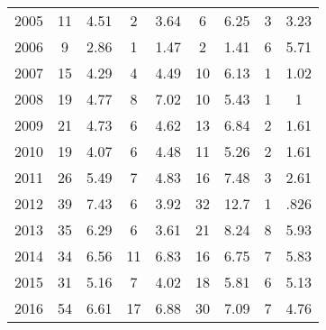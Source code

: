 \begin{table}[htbp]
\begin{tabular}{l*{8}{c}}
2005      &       11&     4.51&        2&     3.64&        6&     6.25&        3&     3.23\\
2006      &        9&     2.86&        1&     1.47&        2&     1.41&        6&     5.71\\
2007      &       15&     4.29&        4&     4.49&       10&     6.13&        1&     1.02\\
2008      &       19&     4.77&        8&     7.02&       10&     5.43&        1&        1\\
2009      &       21&     4.73&        6&     4.62&       13&     6.84&        2&     1.61\\
2010      &       19&     4.07&        6&     4.48&       11&     5.26&        2&     1.61\\
2011      &       26&     5.49&        7&     4.83&       16&     7.48&        3&     2.61\\
2012      &       39&     7.43&        6&     3.92&       32&     12.7&        1&     .826\\
2013      &       35&     6.29&        6&     3.61&       21&     8.24&        8&     5.93\\
2014      &       34&     6.56&       11&     6.83&       16&     6.75&        7&     5.83\\
2015      &       31&     5.16&        7&     4.02&       18&     5.81&        6&     5.13\\
2016      &       54&     6.61&       17&     6.88&       30&     7.09&        7&     4.76\\
\hline\hline
\end{tabular}
\end{table}
